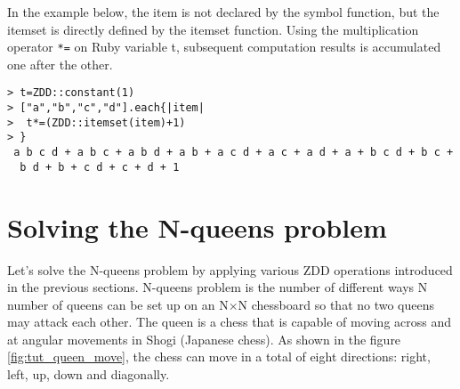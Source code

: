 In the example below, the item is not declared by the symbol function, but the itemset is  directly defined by the itemset function. Using the multiplication operator \verb|*=| on Ruby variable t, subsequent computation results is accumulated one after the other. 

\begin{Verbatim}[baselinestretch=0.7,frame=single]
> t=ZDD::constant(1)
> ["a","b","c","d"].each{|item|
>  t*=(ZDD::itemset(item)+1)
> }
 a b c d + a b c + a b d + a b + a c d + a c + a d + a + b c d + b c +
  b d + b + c d + c + d + 1
\end{Verbatim}

\section{Solving the N-queens problem}
Let's solve the N-queens problem by applying various ZDD operations introduced in the previous sections.  N-queens problem is the number of different ways N number of queens can be set up on an N$\times$N chessboard so that no two queens may attack each other. 
The queen is a chess that is capable of moving across and at angular movements in Shogi (Japanese chess). As shown in the figure \ref{fig:tut_queen_move},  the chess can move in a total of eight directions: right, left, up, down and diagonally.

